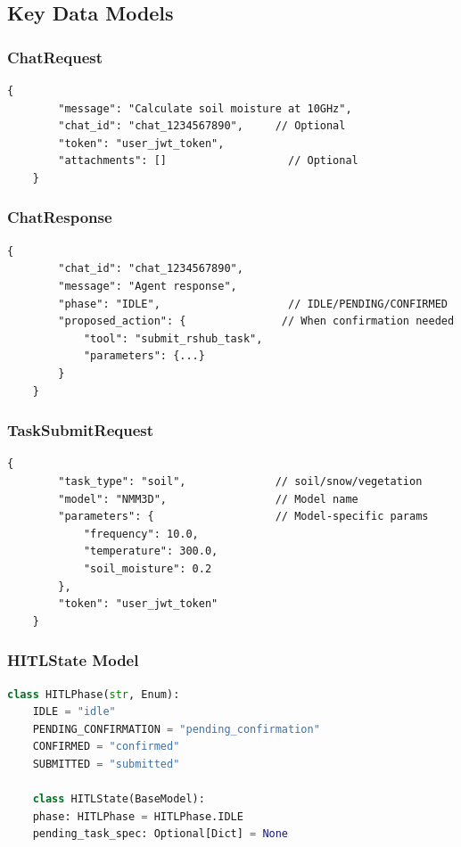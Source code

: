 \subsection{Key Data Models}

\subsubsection{ChatRequest}

\begin{lstlisting}[style=jsonstyle, basicstyle=\ttfamily\scriptsize]
	{
		"message": "Calculate soil moisture at 10GHz",
		"chat_id": "chat_1234567890",     // Optional
		"token": "user_jwt_token",
		"attachments": []                   // Optional
	}
\end{lstlisting}

\subsubsection{ChatResponse}

\begin{lstlisting}[style=jsonstyle, basicstyle=\ttfamily\scriptsize]
	{
		"chat_id": "chat_1234567890",
		"message": "Agent response",
		"phase": "IDLE",                    // IDLE/PENDING/CONFIRMED
		"proposed_action": {               // When confirmation needed
			"tool": "submit_rshub_task",
			"parameters": {...}
		}
	}
\end{lstlisting}

\subsubsection{TaskSubmitRequest}

\begin{lstlisting}[style=jsonstyle, basicstyle=\ttfamily\scriptsize]
	{
		"task_type": "soil",              // soil/snow/vegetation
		"model": "NMM3D",                 // Model name
		"parameters": {                   // Model-specific params
			"frequency": 10.0,
			"temperature": 300.0,
			"soil_moisture": 0.2
		},
		"token": "user_jwt_token"
	}
\end{lstlisting}

\subsubsection{HITLState Model}

\begin{lstlisting}[language=Python, basicstyle=\ttfamily\scriptsize]
	class HITLPhase(str, Enum):
	IDLE = "idle"
	PENDING_CONFIRMATION = "pending_confirmation"
	CONFIRMED = "confirmed"
	SUBMITTED = "submitted"
	
	class HITLState(BaseModel):
	phase: HITLPhase = HITLPhase.IDLE
	pending_task_spec: Optional[Dict] = None
\end{lstlisting}

